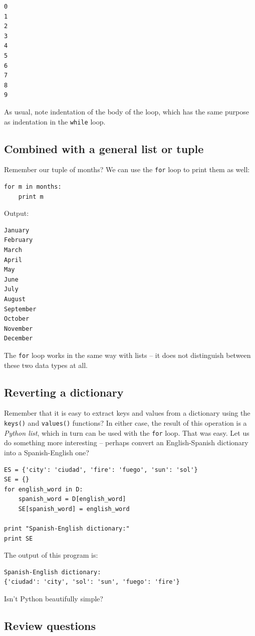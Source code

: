 \begin{verbatim}
0
1
2
3
4
5
6
7
8
9
\end{verbatim}
As usual, note indentation of the body of the loop, which has the same 
purpose as indentation in the {\tt while} loop. 

\subsection{Combined with a general list or tuple}

Remember our tuple of months? We can use the {\tt for} loop to print them as well:

\begin{verbatim}
for m in months:
    print m
\end{verbatim}
Output:

\begin{verbatim}
January
February
March
April
May
June
July
August
September
October
November
December
\end{verbatim}
The {\tt for} loop works in the same way with lists -- it does not distinguish between these 
two data types at all.

\subsection{Reverting a dictionary}

Remember that it is easy to extract keys and values from a dictionary using the 
{\tt keys()} and {\tt values()} functions? In either case, the result of this operation 
is a {\em Python list}, which in turn can be used with the {\tt for} loop. That was easy. Let us do something more interesting -- 
perhaps convert an English-Spanish dictionary into a Spanish-English one? 

\begin{verbatim}
ES = {'city': 'ciudad', 'fire': 'fuego', 'sun': 'sol'}
SE = {}
for english_word in D:
    spanish_word = D[english_word]
    SE[spanish_word] = english_word
    
print "Spanish-English dictionary:"
print SE
\end{verbatim}
The output of this program is:

\begin{verbatim}
Spanish-English dictionary:
{'ciudad': 'city', 'sol': 'sun', 'fuego': 'fire'}
\end{verbatim}
Isn't Python beautifully simple?

\subsection{Review questions}

